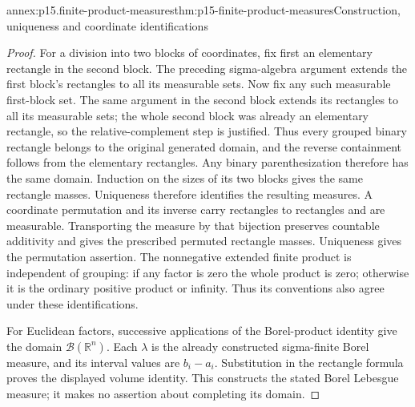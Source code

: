 \begin{annexitem}{annex:p15.finite-product-measures}{thm:p15-finite-product-measures}{Construction, uniqueness and coordinate identifications}
\begin{proof}
For a division into two blocks of coordinates, fix first an elementary
rectangle in the second block. The preceding sigma-algebra argument
extends the first block's rectangles to all its measurable sets.
Now fix any such measurable first-block set. The same argument in
the second block extends its rectangles to all its measurable sets;
the whole second block was already an elementary rectangle, so the
relative-complement step is justified. Thus every grouped binary
rectangle belongs to the original generated domain, and the reverse
containment follows from the elementary rectangles. Any binary
parenthesization therefore has the same domain. Induction on the
sizes of its two blocks gives the same rectangle masses. Uniqueness
therefore identifies the resulting measures. A coordinate permutation
and its inverse carry rectangles to rectangles and are measurable.
Transporting the measure by that bijection preserves countable additivity
and gives the prescribed permuted rectangle masses. Uniqueness gives the
permutation assertion. The nonnegative extended finite product is
independent of grouping: if any factor is zero the whole product is zero;
otherwise it is the ordinary positive product or infinity. Thus its
conventions also agree under these identifications.

For Euclidean factors, successive applications of the Borel-product
identity give the domain \(\mathcal B(\mathbb R^n)\). Each
\(\lambda\) is the already constructed sigma-finite Borel measure,
and its interval values are \(b_i-a_i\). Substitution in the
rectangle formula proves the displayed volume identity. This constructs
the stated Borel Lebesgue measure; it makes no assertion about completing
its domain.
\end{proof}
\end{annexitem}


